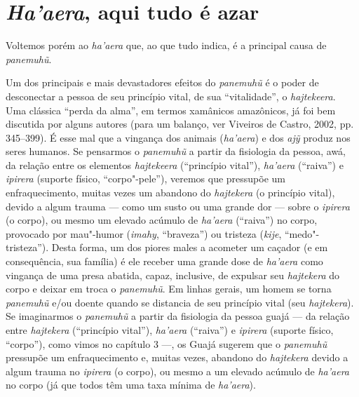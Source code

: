 \section{\emph{Ha'aera}, aqui tudo é azar}

Voltemos porém ao \emph{ha'aera} que, ao que tudo indica, é a principal
causa de \emph{panemuhũ}.

Um dos principais e mais devastadores efeitos do \emph{panemuhũ} é o
poder de desconectar a pessoa de seu princípio vital, de sua
``vitalidade'', o \emph{hajtekeera}. Uma clássica ``perda da alma'', em
termos xamânicos amazônicos, já foi bem discutida por alguns autores
(para um balanço, ver Viveiros de Castro, 2002, pp. 345--399). É esse mal que
a vingança dos animais (\emph{ha'aera}) e dos \emph{ajỹ} produz nos
seres humanos. Se pensarmos o \emph{panemuhũ} a partir da fisiologia da
pessoa, awá, da relação entre os elementos \emph{hajtekeera}
(``princípio vital''), \emph{ha'aera} (``raiva'') e \emph{ipirera}
(suporte físico, ``corpo"-pele''), veremos que pressupõe um
enfraquecimento, muitas vezes um abandono do \emph{hajtekera} (o
princípio vital), devido a algum trauma --- como um susto ou uma grande
dor --- sobre o \emph{ipirera} (o corpo), ou mesmo um elevado acúmulo de
\emph{ha'aera} (``raiva'') no corpo, provocado por mau"-humor
(\emph{imahy}, ``braveza'') ou tristeza (\emph{kije},
``medo"-tristeza''). Desta forma, um dos piores males a acometer um
caçador (e em consequência, sua família) é ele receber uma grande dose
de \emph{ha'aera} como vingança de uma presa abatida, capaz, inclusive,
de expulsar seu \emph{hajtekera} do corpo e deixar em troca o
\emph{panemuhũ}. Em linhas gerais, um homem se torna \emph{panemuhũ}
e/ou doente quando se distancia de seu princípio vital (seu
\emph{hajtekera}). Se imaginarmos o \emph{panemuhũ} a partir da
fisiologia da pessoa guajá --- da relação entre \emph{hajtekera}
(``princípio vital''), \emph{ha'aera} (``raiva'') e \emph{ipirera} (suporte
físico, ``corpo''), como vimos no capítulo 3 ---, os Guajá sugerem que o
\emph{panemuhũ} pressupõe um enfraquecimento e, muitas vezes, abandono
do \emph{hajtekera} devido a algum trauma no \emph{ipirera} (o corpo),
ou mesmo a um elevado acúmulo de \emph{ha'aera} no corpo (já que todos
têm uma taxa mínima de \emph{ha'aera}).

